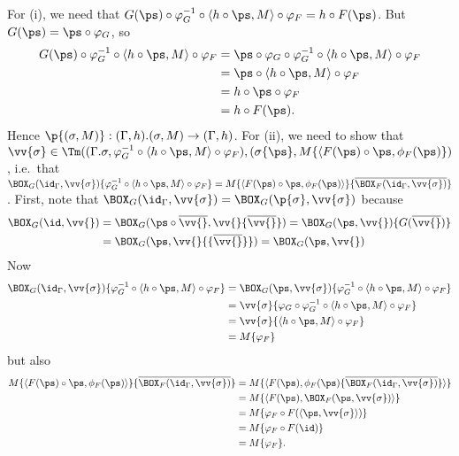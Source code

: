 \documentclass{article}
\newcommand{\isoFL}{\ensuremath{\phi_{F}}} %
\begin{document}
For (i), we need that $G(\ps) \circ \varphi_G^{-1} \circ \langle h
\circ \ps, M\rangle \circ \varphi_F = h \circ F(\ps)$. But $G(\ps) = \ps \circ \varphi_G$, so
\begin{align*}
   G(\ps) \circ \varphi_G^{-1} \circ \langle h \circ \ps, M\rangle \circ \varphi_F
&= \ps \circ \varphi_G \circ \varphi_G^{-1} \circ \langle h \circ \ps, M\rangle \circ \varphi_F \\
&= \ps \circ \langle h \circ \ps, M\rangle \circ \varphi_F \\
&= h \circ \ps \circ \varphi_F \\
&= h \circ F(\ps).
\end{align*}
Hence $\p{(\sigma, M)} : (\Gamma, h).(\sigma, M) \to (\Gamma, h)$.
For (ii), we need to show that $\vv{\sigma} \in
\Tm((\Gamma.\sigma, \varphi_G^{-1} \circ \langle h \circ \ps, M
\rangle \circ \varphi_F), (\sigma\{\ps\}, M\{\langle F(\ps) \circ \ps,
\isoFL(\ps)\})$, i.e.\ that
$\BOX_G(\id_\Gamma, \vv{\sigma})\{\varphi_G^{-1} \circ \langle h \circ \ps, M
\rangle \circ \varphi_F\} = M\{\langle F(\ps) \circ \ps,
\isoFL(\ps)\rangle\}\{\overline{\BOX_F(\id_{\Gamma}, \vv{\sigma})}\}$. First, note that
$\BOX_G(\id_\Gamma, \vv{\sigma}) = \BOX_G(\p{\sigma}, \vv{\sigma})$ because
\begin{align*}
\BOX_G(\id, \vv{}) &= \BOX_G(\ps \circ \overline{\vv{}}, \vv{}\{\overline{\vv{}}\})
                      = \BOX_G(\ps, \vv{})\{G(\overline{\vv{}})\} \\
                      &= \BOX_G(\ps, \vv{}{\{\overline{\vv{}}\}})
                      = \BOX_G(\ps, \vv{})
\end{align*}
Now
\begin{align*}
  \BOX_G(\id_\Gamma, \vv{\sigma})\{\varphi_G^{-1} \circ \langle h \circ \ps, M
\rangle \circ \varphi_F\}
 &= \BOX_G(\ps, \vv{\sigma})\{\varphi_G^{-1} \circ \langle h \circ \ps, M
\rangle \circ \varphi_F\} \\
 &= \vv{\sigma}\{\varphi_G \circ \varphi_G^{-1} \circ \langle h \circ \ps, M
\rangle \circ \varphi_F\} \\
 &= \vv{\sigma}\{\langle h \circ \ps, M \rangle \circ \varphi_F\} \\
 &= M\{\varphi_F\}
\end{align*}
but also
\begin{align*}
  M\{\langle F(\ps) \circ \ps,
\isoFL(\ps)\rangle\}\{\overline{\BOX_F(\id_{\Gamma}, \vv{\sigma})}\}
 &= M\{\langle F(\ps),\isoFL(\ps)\{\overline{\BOX_F(\id_{\Gamma}, \vv{\sigma})}\}\rangle\} \\
 &= M\{\langle F(\ps),\BOX_F(\ps, \vv{\sigma})\rangle\} \\
 &= M\{\varphi_F \circ F(\langle \ps, \vv{\sigma}\rangle)\} \\
 &= M\{\varphi_F \circ F(\id)\} \\
 &= M\{\varphi_F\} .
\end{align*}
\end{document}
